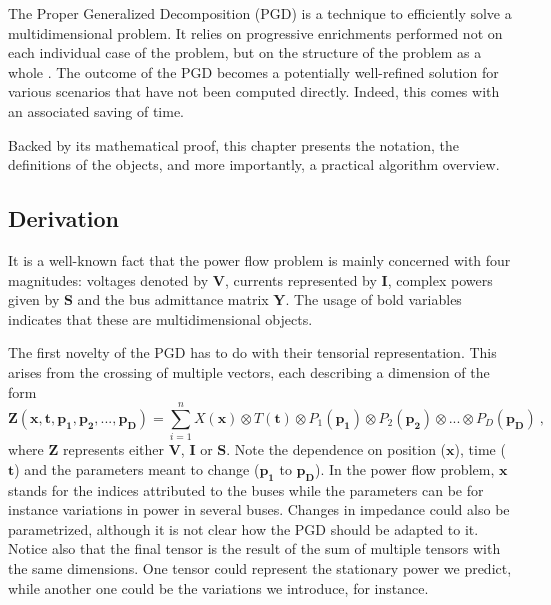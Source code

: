 The Proper Generalized Decomposition (PGD) is a technique to efficiently solve a multidimensional problem. It relies on progressive enrichments performed not on each individual case of the problem, but on the structure of the problem as a whole \cite{chinesta2010recent,blanco2017efficient}. The outcome of the PGD becomes a potentially well-refined solution for various scenarios that have not been computed directly. Indeed, this comes with an associated saving of time. 

Backed by its mathematical proof, this chapter presents the notation, the definitions of the objects, and more importantly, a practical algorithm overview.

\subsection{Derivation}
It is a well-known fact that the power flow problem is mainly concerned with four magnitudes: voltages denoted by $\bm{V}$, currents represented by $\bm{I}$, complex powers given by $\bm{S}$ and the bus admittance matrix $\bm{Y}$. The usage of bold variables indicates that these are multidimensional objects.

The first novelty of the PGD has to do with their tensorial representation. This arises from the crossing of multiple vectors, each describing a dimension of the form 
\begin{equation}
	\bm{Z} (\bm{x},\bm{t},\bm{p_1},\bm{p_2},...,\bm{p_D}) = \sum_{i=1}^{n}X(\bm{x})\otimes T(\bm{t})\otimes P_1(\bm{p_1})\otimes P_2(\bm{p_2})\otimes ... \otimes P_D(\bm{p_D}) \ ,
\label{eq:full}
\end{equation}
where $\bm{Z}$ represents either $\bm{V}$, $\bm{I}$ or $\bm{S}$. Note the dependence on position ($\bm{x}$), time ($\bm{t}$) and the parameters meant to change ($\bm{p_1}$ to $\bm{p_D}$). In the power flow problem, $\bm{x}$ stands for the indices attributed to the buses while the parameters can be for instance variations in power in several buses. Changes in impedance could also be parametrized, although it is not clear how the PGD should be adapted to it. Notice also that the final tensor is the result of the sum of multiple tensors with the same dimensions. One tensor could represent the stationary power we predict, while another one could be the variations we introduce, for instance.

